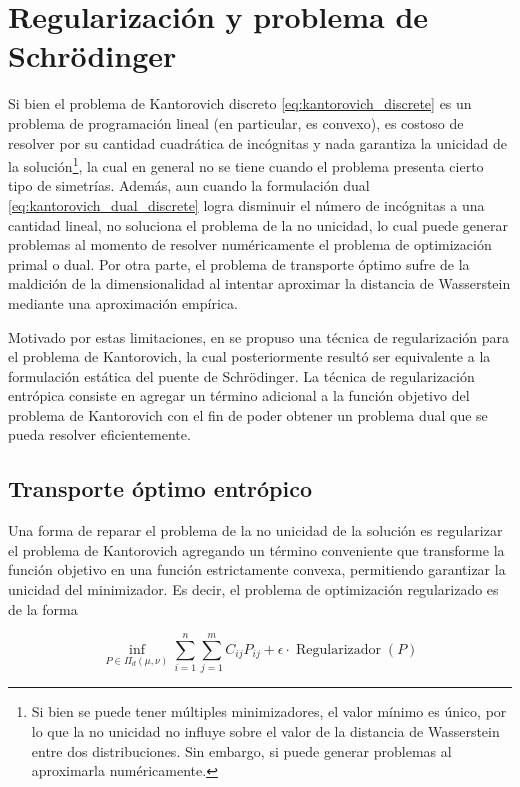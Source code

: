 \chapter{Regularización y problema de Schrödinger}
\label{eot_sbp}

Si bien el problema de Kantorovich discreto \eqref{eq:kantorovich_discrete} es un problema de programación lineal (en particular, es convexo), es costoso de resolver por su cantidad cuadrática de incógnitas y nada garantiza la unicidad de la solución\footnote{Si bien se puede tener múltiples minimizadores, el valor mínimo es único, por lo que la no unicidad no influye sobre el valor de la distancia de Wasserstein entre dos distribuciones. Sin embargo, si puede generar problemas al aproximarla numéricamente.}, la cual en general no se tiene cuando el problema presenta cierto tipo de simetrías. Además, aun cuando la formulación dual \eqref{eq:kantorovich_dual_discrete} logra disminuir el número de incógnitas a una cantidad lineal, no soluciona el problema de la no unicidad, lo cual puede generar problemas al momento de resolver numéricamente el problema de optimización primal o dual. Por otra parte, el problema de transporte óptimo sufre de la maldición de la dimensionalidad al intentar aproximar la distancia de Wasserstein mediante una aproximación empírica.

Motivado por estas limitaciones, en \cite{cuturi2013sinkhorn} se propuso una técnica de regularización para el problema de Kantorovich, la cual posteriormente resultó ser equivalente a la formulación estática del puente de Schrödinger. La técnica de regularización entrópica consiste en agregar un término adicional a la función objetivo del problema de Kantorovich con el fin de poder obtener un problema dual que se pueda resolver eficientemente.

\section{Transporte óptimo entrópico}
\label{eot_sbp/regularized}

Una forma de reparar el problema de la no unicidad de la solución es regularizar el problema de Kantorovich agregando un término conveniente que transforme la función objetivo en una función estrictamente convexa, permitiendo garantizar la unicidad del minimizador. Es decir, el problema de optimización regularizado es de la forma

\begin{equation}
	\label{eq:eot_motivation_discrete}
	\inf_{P\in \Pi_d(\mu,\nu)} \sum_{i=1}^n \sum_{j=1}^m C_{ij}P_{ij} + \epsilon \cdot\operatorname{Regularizador}(P)
\end{equation}

